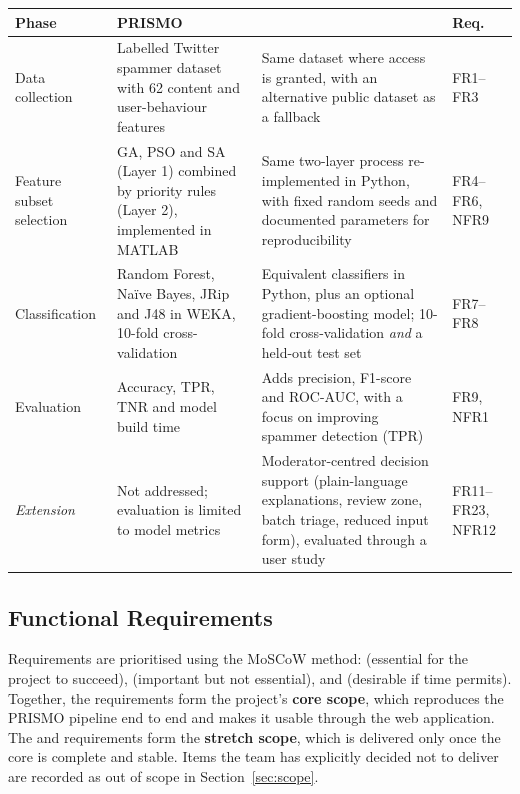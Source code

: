 \begin{center}
\label{tab:prismo-alignment}
\begin{tabularx}{\textwidth}{@{}>{\raggedright\arraybackslash}p{} >{\raggedright\arraybackslash}X >{\raggedright\arraybackslash}X >{\raggedright\arraybackslash}p{}@{}}
  \toprule
  \textbf{Phase} & \textbf{PRISMO \parencite{agrawal2018prismo}} & \textbf{\projectname{}} & \textbf{Req.} \\
  \midrule
  Data collection & Labelled Twitter spammer dataset with 62 content and user-behaviour features & Same dataset where access is granted, with an alternative public dataset as a fallback & FR1--FR3 \\
  \addlinespace
  Feature subset selection & GA, PSO and SA (Layer 1) combined by priority rules (Layer 2), implemented in MATLAB & Same two-layer process re-implemented in Python, with fixed random seeds and documented parameters for reproducibility & FR4--FR6, NFR9 \\
  \addlinespace
  Classification & Random Forest, Na\"ive Bayes, JRip and J48 in WEKA, 10-fold cross-validation & Equivalent classifiers in Python, plus an optional gradient-boosting model; 10-fold cross-validation \emph{and} a held-out test set & FR7--FR8 \\
  \addlinespace
  Evaluation & Accuracy, TPR, TNR and model build time & Adds precision, F1-score and ROC-AUC, with a focus on improving spammer detection (TPR) & FR9, NFR1 \\
  \addlinespace
  \emph{Extension} & Not addressed; evaluation is limited to model metrics & Moderator-centred decision support (plain-language explanations, review zone, batch triage, reduced input form), evaluated through a user study & FR11--FR23, NFR12 \\
  \bottomrule
\end{tabularx}
\end{center}

\subsection{Functional Requirements}\label{sec:functional-req}

Requirements are prioritised using the MoSCoW method: \must{} (essential for the project to succeed), \should{} (important but not essential), and \could{} (desirable if time permits). Together, the \must{} requirements form the project's \textbf{core scope}, which reproduces the PRISMO pipeline end to end and makes it usable through the web application. The \should{} and \could{} requirements form the \textbf{stretch scope}, which is delivered only once the core is complete and stable. Items the team has explicitly decided not to deliver are recorded as out of scope in Section~\ref{sec:scope}.

